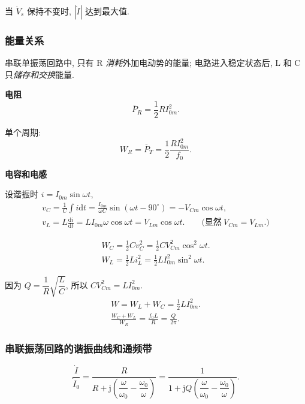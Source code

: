 当 $\dot{V}_s$ 保持不变时, $|\dot{I}|$ 达到最大值.

\subsubsection{能量关系} \label{能量关系}

串联单振荡回路中, 只有 R \textit{消耗}外加电动势的能量; 电路进入稳定状态后, L 和 C 只\textit{储存和交换}能量.

\textbf{电阻}
\begin{equation}
    \overline{P}_R=\frac{1}{2}RI_{0m}^2.
\end{equation}

单个周期:
\begin{equation}
    W_R=\overline{P}_T=\frac{1}{2}\frac{RI_{0m}^2}{f_0}.
\end{equation}

\textbf{电容和电感}

设谐振时 $i=I_{0m}\sin\omega t$,
\begin{equation*}
    \begin{gathered}
        v_C=\frac{1}{C}\int i\mathrm{d}t=\frac{I_{0m}}{\omega C}\sin(\omega t-90^\circ)=-V_{Cm}\cos\omega t, \\
        v_L=L\frac{\mathrm{d}i}{\mathrm{d}t}=LI_{0m}\omega\cos\omega t=V_{Lm}\cos\omega t.\qquad\textrm{(显然}\ V_{Cm}=V_{Lm}\textrm{.)}
    \end{gathered}
\end{equation*}

\rmg
\begin{gather}
    W_C=\frac{1}{2}Cv_C^2=\frac{1}{2}CV_{Cm}^2\cos^2\omega t. \\
    W_L=\frac{1}{2}Li_L^2=\frac{1}{2}LI_{0m}^2\sin^2\omega t.
\end{gather}

因为 $Q=\dfrac{1}{R}\sqrt{\dfrac{L}{C}}$, 所以 $CV_{Cm}^2=LI_{0m}^2$.
\srmg
\begin{gather}
    W=W_L+W_C=\frac{1}{2}LI_{0m}^2. \\
    \frac{W_C+W_L}{W_R}=\frac{f_0L}{R}=\frac{Q}{2\pi}.
\end{gather}

\subsubsection{串联振荡回路的谐振曲线和通频带} \label{串联振荡回路的谐振曲线和通频带}

\rmg
\begin{equation}
    \frac{\dot{I}}{\dot{I}_0}=\frac{R}{R+\mathrm{j}\left(\dfrac{\omega}{\omega_0}-\dfrac{\omega_0}{\omega}\right)}=\frac{1}{1+\mathrm{j}Q\left(\dfrac{\omega}{\omega_0}-\dfrac{\omega_0}{\omega}\right)}.
\end{equation}

